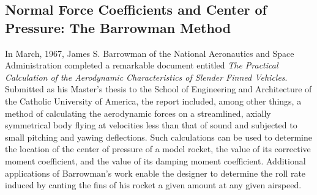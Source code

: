 \subsection{Normal Force Coefficients and Center of Pressure: The Barrowman Method}\label{ch2:sec:4.1}

In March, 1967, James S. Barrowman of the National Aeronautics and Space
Administration completed a remarkable document entitled \emph{The Practical
Calculation of the Aerodynamic Characteristics of Slender Finned Vehicles}.
Submitted as his Master's thesis to the School of Engineering and
Architecture of the Catholic University of America, the report included,
among other things, a method of calculating the aerodynamic forces on a
streamlined, axially symmetrical body flying at velocities less than that of
sound and subjected to small pitching and yawing deflections. Such
calculations can be used to determine the location of the center of pressure
of a model rocket, the value of its corrective moment coefficient, and the
value of its damping moment coefficient. Additional applications of
Barrowman's work enable the designer to determine the roll rate induced by
canting the fins of his rocket a given amount at any given airspeed.

